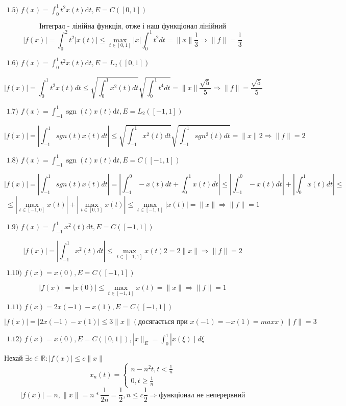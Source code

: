 \begin{tcolorbox}
    $
    \text { 1.5) } f(x)=\int_{0}^{1} t^{2} x(t) \mathrm{d} t, E=C([0,1]) 
    $

    $$ \text{Інтеграл - лінійна функція, отже і наш функціонал лінійний} $$
    $$ |f(x)| = \int_0^2 t^2 |x(t)| \le \max_{t \in[0,1]}|x|\int_{0}^{1}t^2dt = 
    \|x\| \frac{1}{3} \Rightarrow \|f\| = \frac{1}{3}$$

    $
    \text { 1.6) } f(x)=\int_{0}^{1} t^{2} x(t) \mathrm{d} t, E=L_{2}([0,1]) 
    $

    $$ |f(x)| = \int_0^1t^2x(t)dt \le 
    \sqrt{\int_0^1x^2(t)dt} \sqrt{\int_0^1t^4dt} = 
    \|x\|\frac{\sqrt{5}}{5} \Rightarrow \|f\|=\frac{\sqrt{5}}{5}$$

    $
    \text { 1.7) } f(x)=\int_{-1}^{1} \operatorname{sgn}(t) x(t) \mathrm{d} t, E=L_{2}([-1,1]) 
    $

    $$ |f(x)| = |\int_{-1}^1sgn(t)x(t)dt| \le 
    \sqrt{\int_{-1}^1x^2(t)dt} \sqrt{\int_{-1}^{1}sgn^2(t)dt} = 
    \|x\| 2 \Rightarrow \|f\| = 2 $$

    $
    \text { 1.8) } f(x)=\int_{-1}^{1} \operatorname{sgn}(t) x(t) \mathrm{d} t, E=C([-1,1]) 
    $
    
    $$ |f(x)| = |\int_{-1}^1sgn(t)x(t)dt| = 
    | \int_{-1}^{0}-x(t)dt + \int_{0}^1x(t)dt | \le 
    | \int_{-1}^{0}-x(t)dt| + | \int_{0}^1x(t)dt | \le $$ 
    $$
    \le | \max_{t\in[-1,0]}x(t)| + |\max_{t\in[0, 1]}x(t)| \le 
    \max_{t\in[-1, 1]}|x(t)| = \|x\| \Rightarrow \|f\| = 1$$


    $
    \text { 1.9) } f(x)=\int_{-1}^{1}x^{2}(t) \mathrm{d} t, E=C([-1,1]) 
    $

    $$ |f(x)| =|\int_{-1}^{1}x^{2}(t)dt| \le 
    \max_{t \in [-1, 1]} x(t) 2 = 2\|x\| \Rightarrow \|f\| = 2  $$

    $
    \text { 1.10) } f(x)=x(0), E=C([-1,1]) 
    $

    $$|f(x)| = |x(0)| \le \max_{t\in[-1, 1]}x(t) = \|x\| \Rightarrow \|f\| = 1$$

    $
    \text { 1.11) } f(x)=2 x(-1)-x(1), E=C([-1,1]) 
    $

    $$ |f(x)| = |2x(-1) - x(1)| \le 3\|x\| (\text{досягається при } x(-1) = -x(1) = max x) 
    \|f\| = 3 $$

    $
    \text { 1.12) } f(x)=x(0), E=C([0,1]),|x \|_{E}=\int_{0}^{1}| x(\xi) \mid d \xi 
    $

    Нехай $\exists c \in \mathbb{R} : |f(x)| \le c\|x\|$
    $$
        x_n(t) = \begin{cases}
                n - n^2t, t < \frac{1}{n} \\
                0, t \geq \frac{1}{n}
              \end{cases}$$
    $$
        |f(x)| = n, \|x\| = n * \frac{1}{2n} = \frac{1}{2}, 
        n \le c \frac{1}{2} \Rightarrow \text{функціонал не неперервний}
    $$


\end{tcolorbox}
